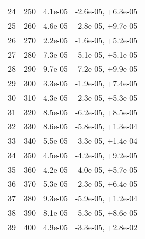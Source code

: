 \begin{table}
\begin{adjustbox}{width=1\textwidth/2}
\begin{tabular}{|c|c|c|c|}
\cline{1-4}
24 & 250 & 4.1e-05 & -2.6e-05, +6.3e-05 \\
\cline{1-4}
25 & 260 & 4.6e-05 & -2.8e-05, +9.7e-05 \\
\cline{1-4}
26 & 270 & 2.2e-05 & -1.6e-05, +5.2e-05 \\
\cline{1-4}
27 & 280 & 7.3e-05 & -5.1e-05, +5.1e-05 \\
\cline{1-4}
28 & 290 & 9.7e-05 & -7.2e-05, +9.9e-05 \\
\cline{1-4}
29 & 300 & 3.3e-05 & -1.9e-05, +7.4e-05 \\
\cline{1-4}
30 & 310 & 4.3e-05 & -2.3e-05, +5.3e-05 \\
\cline{1-4}
31 & 320 & 8.5e-05 & -6.2e-05, +8.5e-05 \\
\cline{1-4}
32 & 330 & 8.6e-05 & -5.8e-05, +1.3e-04 \\
\cline{1-4}
33 & 340 & 5.5e-05 & -3.3e-05, +1.4e-04 \\
\cline{1-4}
34 & 350 & 4.5e-05 & -4.2e-05, +9.2e-05 \\
\cline{1-4}
35 & 360 & 4.2e-05 & -4.0e-05, +5.7e-05 \\
\cline{1-4}
36 & 370 & 5.3e-05 & -2.3e-05, +6.4e-05 \\
\cline{1-4}
37 & 380 & 9.3e-05 & -5.9e-05, +1.2e-04 \\
\cline{1-4}
38 & 390 & 8.1e-05 & -5.3e-05, +8.6e-05 \\
\cline{1-4}
39 & 400 & 4.9e-05 & -3.3e-05, +2.8e-02 \\
\cline{1-4}
\end{tabular}
\end{adjustbox}
\end{table}

